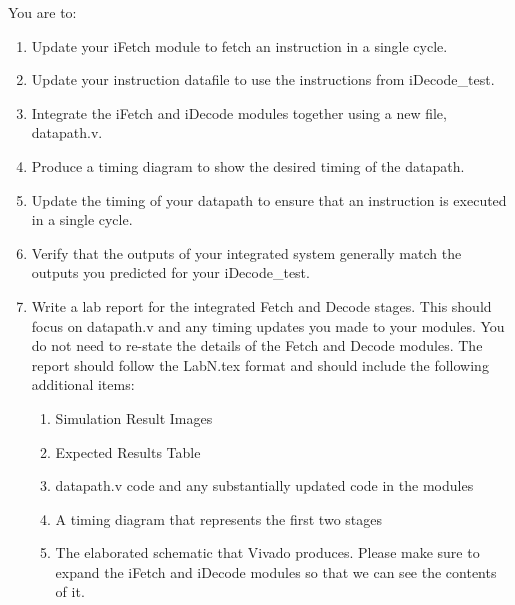 You are to:
\begin{enumerate}
\item Update your iFetch module to fetch an instruction in a single cycle.
\item Update your instruction datafile to use the instructions from iDecode\_test.
\item Integrate the iFetch and iDecode modules together using a new file, datapath.v.
\item Produce a timing diagram to show the desired timing of the datapath. 
\item Update the timing of your datapath to ensure that an instruction is executed in a single cycle.
\item Verify that the outputs of your integrated system generally match the outputs you predicted for your iDecode\_test.
\item Write a lab report for the integrated Fetch and Decode stages.  This should focus on datapath.v and any timing updates you made to your modules.  You do not need to re-state the details of the Fetch and Decode modules.  The report should follow the LabN.tex format and should include the following additional items:
\begin{enumerate}
	\item Simulation Result Images
	\item Expected Results Table
	\item datapath.v code and any substantially updated code in the modules
	\item A timing diagram that represents the first two stages
	\item The elaborated schematic that Vivado produces.  Please make sure to expand the iFetch and iDecode modules so that we can see the contents of it.
\end{enumerate}
\end{enumerate} 